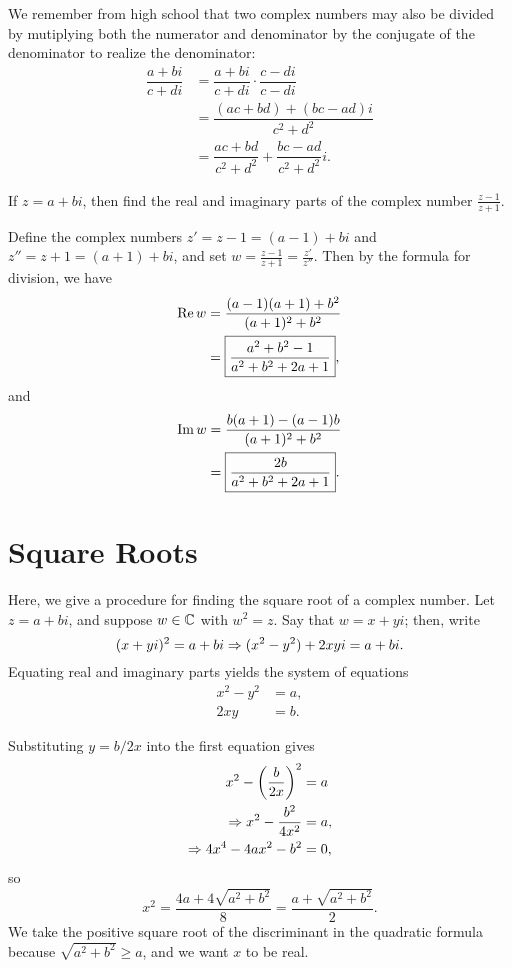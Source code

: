 We remember from high school that two complex numbers may also be divided by mutiplying both the numerator and denominator by the conjugate of the denominator to realize the denominator:
\begin{align*}
	\dfrac{a+bi}{c+di} &=\dfrac{a+bi}{c+di} \cdot \dfrac{c-di}{c-di} \\
	&=\dfrac{(ac+bd)+(bc-ad)i}{c^2+d^2} \\
	&=\dfrac{ac+bd}{c^2+d^2}+\dfrac{bc-ad}{c^2+d^2}i.
\end{align*}

\begin{exercise}
	If $z=a+bi$, then find the real and imaginary parts of the complex number $\frac{z-1}{z+1}$.
	
	\begin{sol}
		Define the complex numbers $z'=z-1=(a-1)+bi$ and $z''=z+1=(a+1)+bi$, and set $w=\frac{z-1}{z+1}=\frac{z'}{z''}$. Then by the formula for division, we have
		\begin{align*}
			\operatorname{Re} w &=\dfrac{(a-1)(a+1)+b^2}{(a+1)^2+b^2} \\
			&=\boxed{\dfrac{a^2+b^2-1}{a^2+b^2+2a+1}},
		\end{align*}
		and
		\begin{align*}
			\operatorname{Im} w &=\dfrac{b(a+1)-(a-1)b}{(a+1)^2+b^2} \\
			&=\boxed{\dfrac{2b}{a^2+b^2+2a+1}}.
		\end{align*}
	\end{sol}
\end{exercise}

\section{Square Roots}
Here, we give a procedure for finding the square root of a complex number. Let $z=a+bi$, and suppose $w \in \mathbb C$ with $w^2=z$. Say that $w=x+yi$; then, write $$(x+yi)^2=a+bi \Rightarrow (x^2-y^2)+2xyi=a+bi.$$ Equating real and imaginary parts yields the system of equations
\begin{align*}
	x^2-y^2 &=a, \\
	2xy &=b.
\end{align*}

Substituting $y=b/2x$ into the first equation gives
\begin{align*}
	x^2-\left(\dfrac{b}{2x}\right)^2 &=a \\
	\Rightarrow x^2-\dfrac{b^2}{4x^2} &=a,\\
	\Rightarrow 4x^4-4ax^2-b^2 &=0,
\end{align*}
so $$x^2=\dfrac{4a+4\sqrt{a^2+b^2}}{8}=\dfrac{a+\sqrt{a^2+b^2}}{2}.$$ We take the positive square root of the discriminant in the quadratic formula because $\sqrt{a^2+b^2} \ge a$, and we want $x$ to be real.

